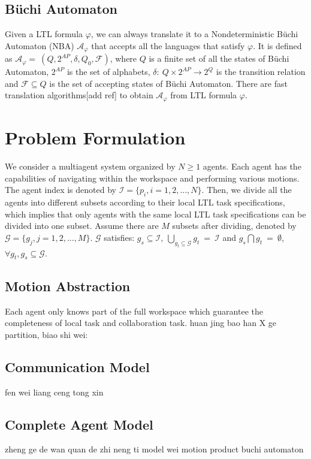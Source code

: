 \documentclass[journal]{IEEEtran}
\begin{document}
\subsection{B\"{u}chi Automaton}
Given a LTL formula $\varphi$, we can always translate it to a Nondeterministic B\"{u}chi Automaton (NBA) $\mathcal{A}_\varphi$ that accepts all the languages that satisfy $\varphi$. It is defined as $\mathcal{A}_\varphi=\ (Q,2^{AP},\delta,Q_0,\mathcal{F})$, where $Q$ is a finite set of all the states of B\"{u}chi Automaton, $2^{AP}$ is the set of alphabets, $\delta:\ Q\times 2^{AP}\rightarrow 2^Q$ is the transition relation and $\mathcal{F}\subseteq Q$ is the set of accepting states of B\"{u}chi Automaton. There are fast translation algorithms[add ref] to obtain $\mathcal{A}_\varphi$ from LTL formula $\varphi$.

\section{Problem Formulation}
We consider a multiagent system organized by $N\geq1$ agents. Each agent has the capabilities of navigating within the workspace and performing various motions. The agent index is denoted by $\mathcal{I}=\{p_i,i=1,2,...,N\}$. Then, we divide all the agents into different subsets according to their local LTL task specifications, which implies that only agents with the same local LTL task specifications can be divided into one subset. Assume there are $M$ subsets after dividing, denoted by $\mathcal{G}=\{g_j,j=1,2,...,M\}$. $\mathcal{G}$ satisfies: $g_s\subseteq \mathcal{I},\ \bigcup_{g_t\subseteq \mathcal{G}}g_t\ =\ \mathcal{I}$ and $g_s\bigcap g_t\ =\ \emptyset$, $\forall g_t,g_s \subseteq \mathcal{G}$.
\subsection{Motion Abstraction}
Each agent only knows part of the full workspace which guarantee the completeness of local task and collaboration task. huan jing bao han X ge partition, biao shi wei:
\subsection{Communication Model}
fen wei liang ceng tong xin
\subsection{Complete Agent Model}
zheng ge de wan quan de zhi neng ti model wei motion product buchi automaton
\end{document}
